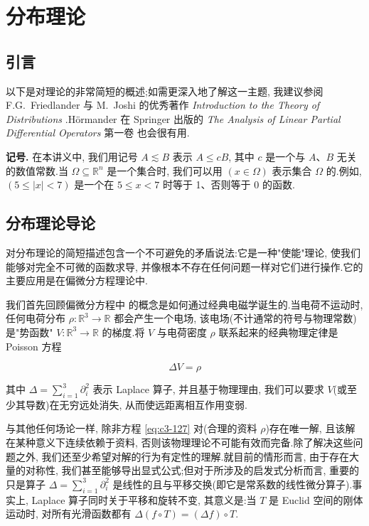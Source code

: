 \chapter{分布理论}

\section*{引言}

以下是对理论的非常简短的概述;如需更深入地了解这一主题, 我建议参阅 F.G.~Friedlander 与 M.~Joshi 的优秀著作 \emph{Introduction to the Theory of Distributions} \cite{fr-io}.Hörmander 在 Springer 出版的 \emph{The Analysis of Linear Partial Differential Operators} 第一卷 \cite{ho} 也会很有用.

\textbf{记号.} 在本讲义中, 我们用记号 $A\lesssim B$ 表示 $A\leq cB$, 其中 $c$ 是一个与 $A$、$B$ 无关的数值常数.当 $\Omega\subseteq\mathbb{R}^n$ 是一个集合时, 我们可以用 $(x\in\Omega)$ 表示集合 $\Omega$ 的.例如, $(5\leq|x|<7)$ 是一个在 $5\leq x<7$ 时等于 1、否则等于 0 的函数.

\section{分布理论导论}

对分布理论的简短描述包含一个不可避免的矛盾说法:它是一种"使能"理论, 使我们能够对完全不可微的函数求导, 并像根本不存在任何问题一样对它们进行操作.它的主要应用是在偏微分方程理论中.

我们首先回顾偏微分方程中  的概念是如何通过经典电磁学诞生的.当电荷不运动时, 任何电荷分布 $\rho : \mathbb{R}^3\to\mathbb{R}$ 都会产生一个电场, 该电场(不计通常的符号与物理常数)是"势函数" $V : \mathbb{R}^3\to\mathbb{R}$ 的梯度.将 $V$ 与电荷密度 $\rho$ 联系起来的经典物理定律是 Poisson 方程

\begin{equation}
\Delta V = \rho\label{eq:c3-127}
\end{equation}

其中 $\Delta = \sum_{i=1}^3\partial_i^2$ 表示 Laplace 算子, 并且基于物理理由, 我们可以要求 $V$(或至少其导数)在无穷远处消失, 从而使远距离相互作用变弱.

与其他任何场论一样, 除非方程 \eqref{eq:c3-127} 对(合理的资料 $\rho$)存在唯一解, 且该解在某种意义下连续依赖于资料, 否则该物理理论不可能有效而完备.除了解决这些问题之外, 我们还至少希望对解的行为有定性的理解.就目前的情形而言, 由于存在大量的对称性, 我们甚至能够导出显式公式;但对于所涉及的启发式分析而言, 重要的只是算子 $\Delta = \sum_{i=1}^3\partial_i^2$ 是线性的且与平移交换(即它是常系数的线性微分算子).事实上, Laplace 算子同时关于平移和旋转不变, 其意义是:当 $T$ 是 Euclid 空间的刚体运动时, 对所有光滑函数都有 $\Delta(f\circ T) = (\Delta f)\circ T$.

